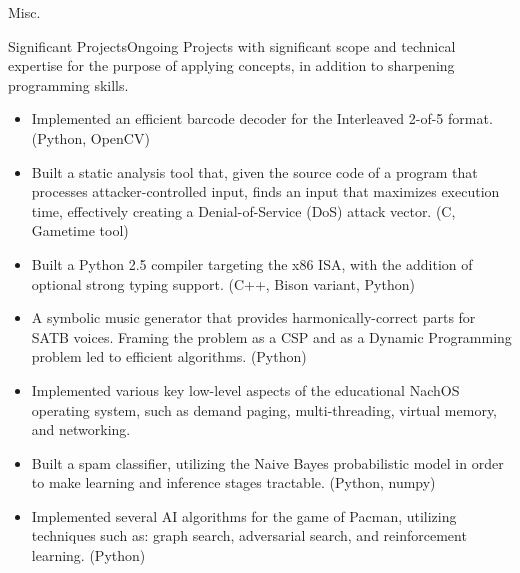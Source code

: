 \documentclass{resume}
\begin{document}
\begin{component}{Misc.}
	\begin{position}{Significant Projects}{Ongoing}
		{}{\vspace{-1.0em}}
	{Projects with significant scope and technical expertise for the purpose of applying concepts, in addition to
	sharpening programming skills.}

	\begin{itemize}
        \vspace{-0.5em}\item Implemented an efficient barcode decoder
        for the Interleaved 2-of-5 format. (Python, OpenCV)
		\vspace{-0.5em}\item Built a static analysis tool that, given the source code of a program that
		processes attacker-controlled input, finds an input that maximizes execution time, effectively
		creating a Denial-of-Service (DoS) attack vector. (C, Gametime tool)
		\vspace{-0.5em}\item Built a Python 2.5 compiler targeting the x86 ISA, with the addition of
		optional strong typing support. (C++, Bison variant, Python)
		\vspace{-0.5em}\item A symbolic music generator that provides harmonically-correct
		parts for SATB voices. Framing the problem as a CSP and as a Dynamic Programming problem led to 
        efficient algorithms.
		(Python)
		\vspace{-0.5em}\item Implemented various key low-level aspects of the 
		educational NachOS operating system, such as demand paging, multi-threading, virtual memory, and 
		networking.
		\vspace{-0.5em}\item Built a spam classifier, utilizing the Naive Bayes probabilistic model in order to make
		learning and inference stages tractable. (Python, numpy)
		\vspace{-0.5em}\item Implemented several AI algorithms for the game of Pacman, utilizing
		techniques such as: graph search, adversarial search, and reinforcement learning. (Python)
	\end{itemize}
	\end{position}
\end{component}

\vspace{-2.0em}
\end{document}
